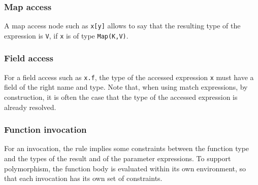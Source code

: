 \documentclass[11pt]{article}
\begin{document}
\begin{center}
 \RightLabel{$ [ \{ freevars(e_i)=\emptyset \}_{i \in [1..n]} ] $}
\DP
\end{center}

\subsubsection{Map access}

A map access node such as \texttt{x[y]} allows to say that the resulting type of the expression is \texttt{V}, if \texttt{x} is of type \texttt{Map(K,V)}.

\begin{center}
 
\DP
\end{center}

\subsubsection{Field access}

For a field access such as \texttt{x.f}, the type of the accessed expression \texttt{x} must have a field of the right name and type. Note that, when using match expressions, by construction, it is often the case that the type of the accessed expression is already resolved.

\begin{center}
\DP
\end{center}

\subsubsection{Function invocation}

For an invocation, the rule implies some constraints between the function type and the types of the result and of the parameter expressions. To support polymorphism, the function body is evaluated within its own environment, so that each invocation has its own set of constraints.

\begin{center}
  
\DP
\end{center}
\end{document}
